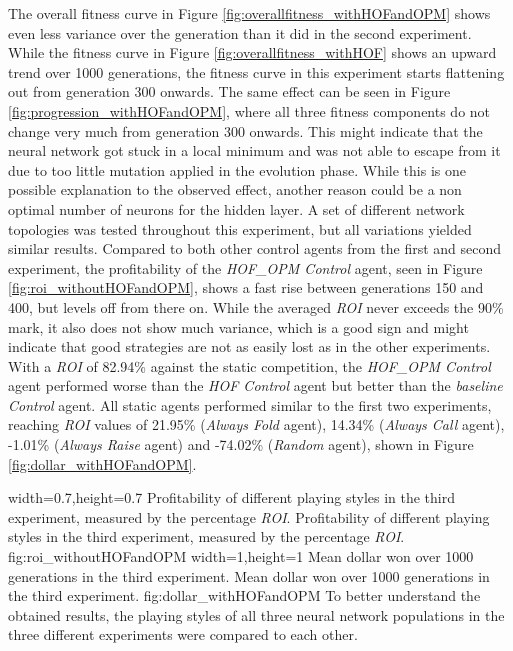 The overall fitness curve in Figure \ref{fig:overallfitness_withHOFandOPM} shows even less variance over the generation than it did in the second experiment. While the fitness curve in Figure \ref{fig:overallfitness_withHOF} shows an upward trend over 1000 generations, the fitness curve in this experiment starts flattening out from generation 300 onwards. The same effect can be seen in Figure \ref{fig:progression_withHOFandOPM}, where all three fitness components do not change very much from generation 300 onwards. This might indicate that the neural network got stuck in a local minimum and was not able to escape from it due to too little mutation applied in the evolution phase. While this is one possible explanation to the observed effect, another reason could be a non optimal number of neurons for the hidden layer. A set of different network topologies was tested throughout this experiment, but all variations yielded similar results. Compared to both other control agents from the first and second experiment, the profitability of the \textit{HOF\_OPM Control} agent, seen in Figure \ref{fig:roi_withoutHOFandOPM}, shows a fast rise between generations 150 and 400, but levels off from there on. While the averaged \textit{ROI} never exceeds the 90\% mark, it also does not show much variance, which is a good sign and might indicate that good strategies are not as easily lost as in the other experiments. With a \textit{ROI} of 82.94\% against the static competition, the \textit{HOF\_OPM Control} agent performed worse than the \textit{HOF Control} agent but better than the \textit{baseline Control} agent. All static agents performed similar to the first two experiments, reaching \textit{ROI} values of 21.95\% (\textit{Always Fold} agent), 14.34\% (\textit{Always Call} agent), -1.01\% (\textit{Always Raise} agent) and -74.02\% (\textit{Random} agent), shown in Figure \ref{fig:dollar_withHOFandOPM}.\par
{}%
  {width=0.7\textwidth,height=0.7\textheight}%
  {Profitability of different playing styles in the third experiment, measured by the percentage \textit{ROI}.}%
  {Profitability of different playing styles in the third experiment, measured by the percentage \textit{ROI}.}%
  {fig:roi_withoutHOFandOPM}%
  {width=1\textwidth,height=1\textheight}%
  {Mean dollar won over 1000 generations in the third experiment.}%
  {Mean dollar won over 1000 generations in the third experiment.}%
  {fig:dollar_withHOFandOPM}%
 To better understand the obtained results, the playing styles of all three neural network populations in the three different experiments were compared to each other. 
